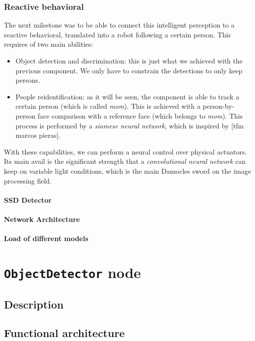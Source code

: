 \subsection{Reactive behavioral}

The next milestone was to be able to connect this intelligent perception to a reactive behavioral, translated into a robot following a certain person. This requires of two main abilities:
\begin{itemize}
	\item Object detection and discrimination: this is just what we achieved with the previous component. We only have to constrain the detections to only keep persons.
	\item People reidentification: as it will be seen, the component is able to track a certain person (which is called \emph{mom}). This is achieved with a person-by-person face comparison with a reference face (which belongs to \emph{mom}). This process is performed by a \emph{siamese neural network}, which is inspired by [tfm marcos pieras].
\end{itemize}

With these capabilities, we can perform a neural control over physical actuators. Its main avail is the significant strength that a \emph{convolutional neural network} can keep on variable light conditions, which is the main Damocles sword on the image processing field.


\subsubsection{SSD Detector}
\subsubsection{Network Architecture}
\subsubsection{Load of different models}


\chapter{\texttt{ObjectDetector} node}
\section{Description}
\section{Functional architecture}
